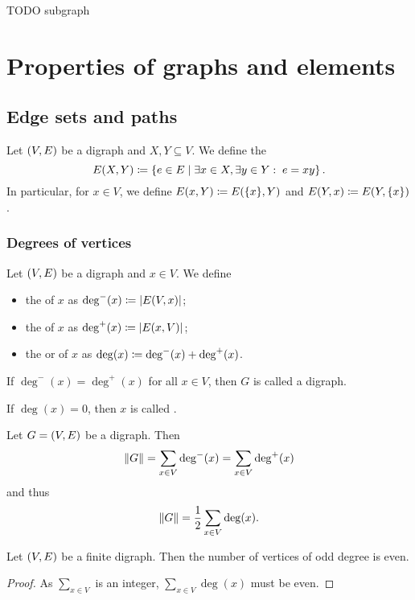 TODO subgraph

\section{Properties of graphs and elements}
\subsection{Edge sets and paths}
\begin{definition}
Let $\left( V,E \right)$ be a digraph and $X,Y\subseteq V$. We define the 
\[ E(X,Y) \coloneqq \left\{ e\in E \;\middle|\; \exists x\in X, \exists y\in Y: \; e = xy \right\}. \]
In particular, for $x\in V$, we define $E(x, Y) \coloneqq E(\{x\}, Y)$ and $E(Y, x) \coloneqq E(Y,\{x\})$.
\end{definition}

\subsubsection{Degrees of vertices}
\begin{definition}
Let $\left( V,E \right)$ be a digraph and $x\in V$. We define
\begin{itemize}
\item the  of $x$ as $\deg^-(x) \coloneqq |E(V,x)|$;
\item the  of $x$ as $\deg^+(x) \coloneqq |E(x, V)|$;
\item the  or  of $x$ as $\deg(x) \coloneqq \deg^-(x) + \deg^+(x)$.
\end{itemize}
If $\deg^-(x) = \deg^+(x)$ for all $x\in V$, then $G$ is called a  digraph.

If $\deg(x) = 0$, then $x$ is called .
\end{definition}

\begin{lemma} \label{degreeSumFormula}
Let $G = \left( V,E \right)$ be a digraph. Then
\[ \lVert G\rVert = \sum_{x\in V}\deg^-(x) = \sum_{x\in V}\deg^+(x) \]
and thus
\[ \lVert G\rVert = \frac{1}{2}\sum_{x\in V}\deg(x). \]
\end{lemma}
\begin{corollary}
Let $\left( V,E \right)$ be a finite digraph. Then the number of vertices of odd degree is even.
\end{corollary}
\begin{proof}
As $\sum_{x\in V}$ is an integer, $\sum_{x\in V}\deg(x)$ must be even.
\end{proof}

